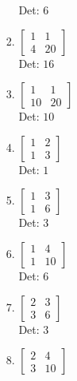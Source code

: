 \documentclass[12pt]{article}
\begin{document}
\begin{enumerate}
\begin{enumerate}
\begin{enumerate}
Det: $6$\\


\item $\displaystyle \left[\begin{matrix}1 & 1\\4 & 20\end{matrix}\right]$\\

Det: $16$\\


\item $\displaystyle \left[\begin{matrix}1 & 1\\10 & 20\end{matrix}\right]$\\

Det: $10$\\


\item $\displaystyle \left[\begin{matrix}1 & 2\\1 & 3\end{matrix}\right]$\\

Det: $1$\\


\item $\displaystyle \left[\begin{matrix}1 & 3\\1 & 6\end{matrix}\right]$\\

Det: $3$\\


\item $\displaystyle \left[\begin{matrix}1 & 4\\1 & 10\end{matrix}\right]$\\

Det: $6$\\


\item $\displaystyle \left[\begin{matrix}2 & 3\\3 & 6\end{matrix}\right]$\\

Det: $3$\\


\item $\displaystyle \left[\begin{matrix}2 & 4\\3 & 10\end{matrix}\right]$\\


\end{enumerate}
\end{enumerate}
\end{enumerate}
\end{document}
